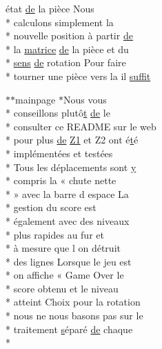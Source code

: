 \begin{DoxyCompactItemize}
état \hyperlink{mainpage_8dox_ab37fa35e77d95c6d0d0ab620c97c3db8}{de} la pièce Nous \\*
calculons simplement la \\*
nouvelle position à partir \hyperlink{mainpage_8dox_ab37fa35e77d95c6d0d0ab620c97c3db8}{de} \\*
la \hyperlink{mainpage_8dox_af2e36bcdda8980a3e5c1f4013331ee45}{matrice} \hyperlink{mainpage_8dox_ab37fa35e77d95c6d0d0ab620c97c3db8}{de} la pièce et du \\*
\hyperlink{mainpage_8dox_aa08a2c237abaf70493855740d9c5d0c8}{sens} \hyperlink{mainpage_8dox_ab37fa35e77d95c6d0d0ab620c97c3db8}{de} rotation Pour faire \\*
tourner une pièce vers la il \hyperlink{mainpage_8dox_a3cef46abe2a50831a9672fa7c65a1bcb}{suffit}
\item 
$\ast$$\ast$mainpage $\ast$Nous vous \\*
conseillons plutô\hyperlink{gl_8h_a00140d6f5c548b26daf170bf16e86a6d}{t} \hyperlink{mainpage_8dox_ab37fa35e77d95c6d0d0ab620c97c3db8}{de} le \\*
consulter ce R\-E\-A\-D\-M\-E sur le web \\*
pour plus \hyperlink{mainpage_8dox_ab37fa35e77d95c6d0d0ab620c97c3db8}{de} \hyperlink{mainpage_8dox_ac1b4262bdb6c0693bc375775d6cfa421}{Z1} et Z2 ont é\hyperlink{gl_8h_a00140d6f5c548b26daf170bf16e86a6d}{t}é \\*
implémentées et testées \\*
Tous les déplacements sont \hyperlink{gl_8h_a74d80fd479c0f6d0153c709949a089ef}{y} \\*
compris la « chute nette \\*
» avec la barre d espace La \\*
gestion du score est \\*
également avec des niveaux \\*
plus rapides au fur et \\*
à mesure que l on détruit \\*
des lignes Lorsque le jeu est \\*
on affiche « Game Over le \\*
score obtenu et le niveau \\*
atteint Choix pour la rotation \\*
nous ne nous basons pas sur le \\*
traitement \hyperlink{gl_8h_ad585a1393cfa368fa9dc3d8ebff640d5}{s}éparé \hyperlink{mainpage_8dox_ab37fa35e77d95c6d0d0ab620c97c3db8}{de} chaque \\*
$$
\end{DoxyCompactItemize}

